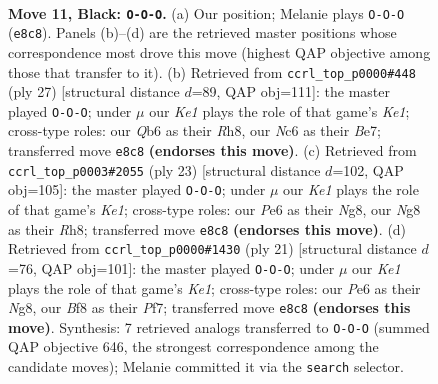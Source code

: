 \documentclass[11pt]{article}
\begin{document}
\clearpage

\begin{figure}[p]\centering
\begin{subfigure}{0.46\textwidth}\centering
\resizebox{\linewidth}{!}{%
\newchessgame
\chessboard[
  setfen={r3kbnr/pp1b1p1p/1qn1p1p1/3pP2P/1P1P2P1/P4N2/5P2/RNBQKB1R b KQkq - 0 11},
  showmover=false,
  pgfstyle=straightmove, color=movearrow, markmove={e8-c8}
]}
\caption{}
\end{subfigure}\hfill
\begin{subfigure}{0.46\textwidth}\centering
\resizebox{\linewidth}{!}{%
\newchessgame
\chessboard[
  setfen={r3k2r/ppqnbpp1/2n1p1p1/2ppP3/3P2PP/2P2N2/PP2NPK1/R1BQ3R b kq - 2 14},
  showmover=false,
  pgfstyle=straightmove, color=movearrow, markmove={e8-c8}
]}
\caption{}
\end{subfigure}
\\[4pt]
\begin{subfigure}{0.46\textwidth}\centering
\resizebox{\linewidth}{!}{%
\newchessgame
\chessboard[
  setfen={r3k1nr/pp1b1p1p/2n1p1p1/3pP3/q1pP4/P1P2B2/2PBNPPP/RQ2K2R b KQkq - 1 12},
  showmover=false,
  pgfstyle=straightmove, color=movearrow, markmove={e8-c8}
]}
\caption{}
\end{subfigure}\hfill
\begin{subfigure}{0.46\textwidth}\centering
\resizebox{\linewidth}{!}{%
\newchessgame
\chessboard[
  setfen={r3k1nr/pp1b1ppp/2n1p3/3pP2P/q1pP4/P1P2N2/2PB1PP1/RQ2KB1R b KQkq - 0 11},
  showmover=false,
  pgfstyle=straightmove, color=movearrow, markmove={e8-c8}
]}
\caption{}
\end{subfigure}
\caption{\textbf{Move 11, Black: \texttt{O-O-O}.} (a) Our position; Melanie plays \texttt{O-O-O} (\texttt{e8c8}). Panels (b)--(d) are the retrieved master positions whose correspondence most drove this move (highest QAP objective among those that transfer to it). (b) Retrieved from \texttt{ccrl\_top\_p0000\#448} (ply 27) [structural distance $d$=89, QAP obj=111]: the master played \texttt{O-O-O}; under $\mu$ our \emph{Ke1} plays the role of that game's \emph{Ke1}; cross-type roles: our \emph{Q}b6 as their \emph{R}h8, our \emph{N}c6 as their \emph{B}e7; transferred move \texttt{e8c8} \textbf{(endorses this move)}. (c) Retrieved from \texttt{ccrl\_top\_p0003\#2055} (ply 23) [structural distance $d$=102, QAP obj=105]: the master played \texttt{O-O-O}; under $\mu$ our \emph{Ke1} plays the role of that game's \emph{Ke1}; cross-type roles: our \emph{P}e6 as their \emph{N}g8, our \emph{N}g8 as their \emph{R}h8; transferred move \texttt{e8c8} \textbf{(endorses this move)}. (d) Retrieved from \texttt{ccrl\_top\_p0000\#1430} (ply 21) [structural distance $d$=76, QAP obj=101]: the master played \texttt{O-O-O}; under $\mu$ our \emph{Ke1} plays the role of that game's \emph{Ke1}; cross-type roles: our \emph{P}e6 as their \emph{N}g8, our \emph{B}f8 as their \emph{P}f7; transferred move \texttt{e8c8} \textbf{(endorses this move)}. Synthesis: 7 retrieved analogs transferred to \texttt{O-O-O} (summed QAP objective 646, the strongest correspondence among the candidate moves); Melanie committed it via the \texttt{search} selector.}
\label{fig:thought-m21}
\end{figure}
\end{document}
